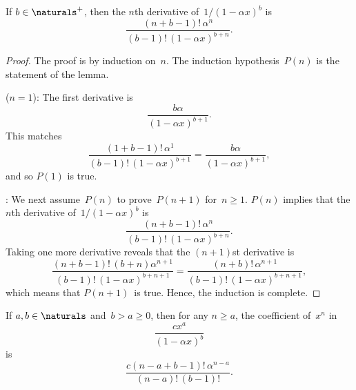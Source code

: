\begin{lemma}\label{lem:12A1}
If $b \in \naturals^+$, then the $n$th derivative of~$1/(1 - \alpha
x)^b$ is
\begin{equation*}
    \frac{ (n + b - 1)! \, \alpha^n }{ (b - 1)! \, (1 - \alpha x)^{b + n} }.
\end{equation*}
\end{lemma}

\begin{proof}
The proof is by induction on~$n$.  The induction hypothesis~$P(n)$ is
the statement of the lemma.

 ($n = 1$): The first derivative is
\begin{equation*}
    \frac{b \alpha}{(1 - \alpha x)^{b + 1}}.
\end{equation*}
This matches
\begin{equation*}
    \frac{(1 + b - 1)!\, \alpha^1}{(b - 1)! \, (1 - \alpha x)^{b + 1}}
    = \frac{b \alpha}{(1 - \alpha x)^{b + 1}},
\end{equation*}
and so $P(1)$ is true.

:
We next assume~$P(n)$ to prove~$P(n + 1)$ for~$n \ge 1$.  $P(n)$
implies that the $n$th derivative of~$1/(1 - \alpha x)^b$ is
\begin{equation*}
    \frac{(n + b - 1)! \, \alpha^n}{(b - 1)! \, (1 - \alpha x)^{b + n}}.
\end{equation*}
Taking one more derivative reveals that the $(n + 1)$st derivative is
\begin{equation*}
\frac{ (n + b - 1)!\, (b + n) \alpha^{n + 1} }
     { (b - 1)!\, (1 - \alpha x)^{b + n + 1} }
  =
\frac{ (n + b)! \, \alpha^{n + 1} }
     { (b - 1)! \, (1 - \alpha x)^{b + n + 1}},
\end{equation*}
which means that $P(n + 1)$~is true.  Hence, the induction is
complete.
\end{proof}

\begin{corollary}\label{cor:12A2}
If $a, b \in \naturals$ and~$b > a \ge 0$, then for any $n \ge a$, the
coefficient of~$x^n$ in
\begin{equation*}
    \frac{c x^a}{(1 - \alpha x)^b}
\end{equation*}
is
\begin{equation*}
    \frac{ c (n - a + b - 1)! \, \alpha^{n - a} }
         { (n - a)! \, (b - 1)! }.
\end{equation*}
\end{corollary}

